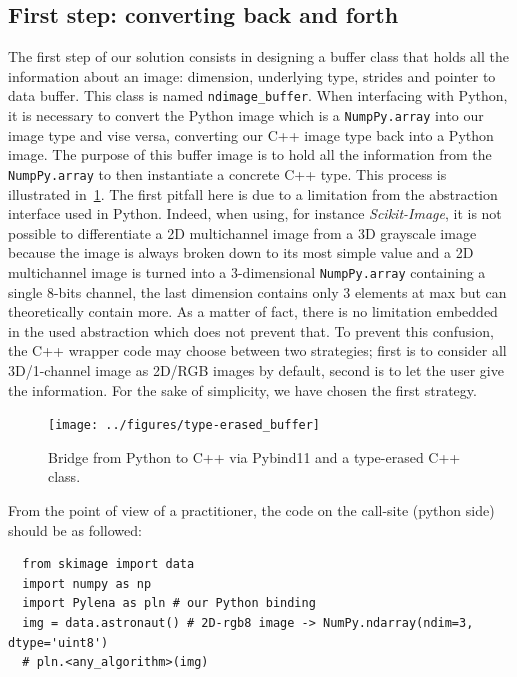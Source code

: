\subsection{First step: converting back and forth}

The first step of our solution consists in designing a buffer class that holds all the information about an image:
dimension, underlying type, strides and pointer to data buffer. This class is named \texttt{ndimage\_buffer}. When
interfacing with Python, it is necessary to convert the Python image which is a \texttt{NumpPy.array} into our image
type and vise versa, converting our C++ image type back into a Python image. The purpose of this buffer image is to hold
all the information from the \texttt{NumpPy.array} to then instantiate a concrete C++ type. This process is illustrated
in~\cref{fig:type-erased.buffer}. The first pitfall here is due to a limitation from the abstraction interface used in
Python. Indeed, when using, for instance \emph{Scikit-Image}, it is not possible to differentiate a 2D multichannel
image from a 3D grayscale image because the image is always broken down to its most simple value and a 2D multichannel
image is turned into a 3-dimensional \texttt{NumpPy.array} containing a single 8-bits channel, the last dimension
contains only 3 elements at max but can theoretically contain more. As a matter of fact, there is no limitation embedded
in the used abstraction which does not prevent that. To prevent this confusion, the C++ wrapper code may choose between
two strategies; first is to consider all 3D/1-channel image as 2D/RGB images by default, second is to let the user give
the information. For the sake of simplicity, we have chosen the first strategy.

\begin{figure}[htbp]
  \centering
  \texttt{[image: ../figures/type-erased\_buffer]}
  \caption{Bridge from Python to C++ via Pybind11 and a type-erased C++ class.}
  \label{fig:type-erased.buffer}
\end{figure}

From the point of view of a practitioner, the code on the call-site (python side) should be as followed:
\begin{verbatim}
  from skimage import data
  import numpy as np
  import Pylena as pln # our Python binding
  img = data.astronaut() # 2D-rgb8 image -> NumPy.ndarray(ndim=3, dtype='uint8')
  # pln.<any_algorithm>(img)
\end{verbatim}

